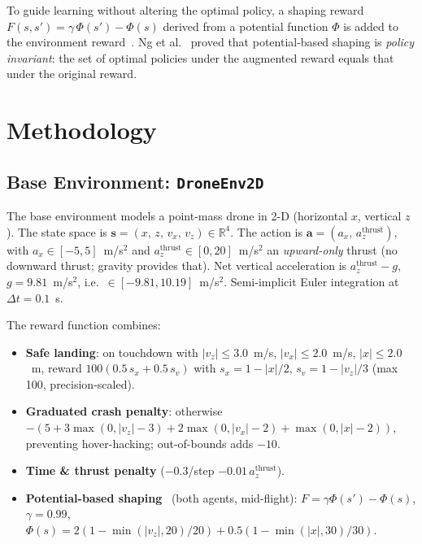\documentclass[10pt,twocolumn]{article}
\begin{document}
To guide learning without altering the optimal policy, a shaping reward
$F(s,s') = \gamma\,\Phi(s') - \Phi(s)$ derived from a potential function $\Phi$
is added to the environment reward~\cite{ng1999}.
Ng et al.~\cite{ng1999} proved that potential-based shaping is
\emph{policy invariant}: the set of optimal policies under the augmented reward
equals that under the original reward.

\section{Methodology}
\label{sec:method}

\subsection{Base Environment: \texttt{DroneEnv2D}}

The base environment models a point-mass drone in 2-D (horizontal $x$,
vertical $z$).
The state space is $\mathbf{s} = (x,\,z,\,v_x,\,v_z) \in \mathbb{R}^4$.
The action is $\mathbf{a} = (a_x,\,a_z^{\text{thrust}})$, with
$a_x\in[-5,5]$~m/s$^2$ and $a_z^{\text{thrust}}\in[0,20]$~m/s$^2$ an
\emph{upward-only} thrust (no downward thrust; gravity provides that).
Net vertical acceleration is $a_z^{\text{thrust}}-g$, $g=9.81$~m/s$^2$, i.e.\
$\in[-9.81,10.19]$~m/s$^2$.
Semi-implicit Euler integration at $\Delta t = 0.1$~s.

The reward function combines:
\begin{itemize}[noitemsep,leftmargin=*]
  \item \textbf{Safe landing}: on touchdown with $|v_z|\le 3.0$~m/s,
        $|v_x|\le 2.0$~m/s, $|x|\le 2.0$~m, reward
        $100(0.5\,s_x+0.5\,s_v)$ with $s_x=1-|x|/2$, $s_v=1-|v_z|/3$
        (max 100, precision-scaled).
  \item \textbf{Graduated crash penalty}: otherwise
        $-(5 + 3\max(0,|v_z|{-}3) + 2\max(0,|v_x|{-}2) + \max(0,|x|{-}2))$,
        preventing hover-hacking; out-of-bounds adds $-10$.
  \item \textbf{Time \& thrust penalty} ($-0.3$/step $- 0.01\,a_z^{\text{thrust}}$).
  \item \textbf{Potential-based shaping}~\cite{ng1999} (both agents,
        mid-flight): $F=\gamma\Phi(s')-\Phi(s)$, $\gamma=0.99$,
        $\Phi(s)=2(1{-}\min(|v_z|,20)/20)+0.5(1{-}\min(|x|,30)/30)$.
\end{itemize}
\end{document}
